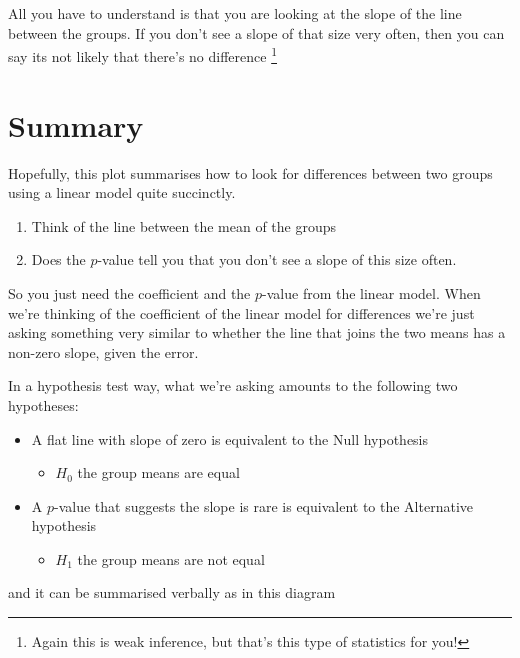 \documentclass[
]{book}
\providecommand{\tightlist}{%
  \setlength{\itemsep}{0pt}\setlength{\parskip}{0pt}}
\begin{document}
All you have to understand is that you are looking at the slope of the line between the groups. If you don't see a slope of that size very often, then you can say its not likely that there's no difference \footnote{Again this is weak inference, but that's this type of statistics for you!}

\hypertarget{summary}{%
\section{Summary}\label{summary}}

Hopefully, this plot summarises how to look for differences between two groups using a linear model quite succinctly.

\begin{enumerate}
\def\labelenumi{\arabic{enumi}.}
\tightlist
\item
  Think of the line between the mean of the groups
\item
  Does the \(p\)-value tell you that you don't see a slope of this size often.
\end{enumerate}

So you just need the coefficient and the \(p\)-value from the linear model.
When we're thinking of the coefficient of the linear model for differences we're just asking something very similar to whether the line that joins the two means has a non-zero slope, given the error.

In a hypothesis test way, what we're asking amounts to the following two hypotheses:

\begin{itemize}
\tightlist
\item
  A flat line with slope of zero is equivalent to the Null hypothesis

  \begin{itemize}
  \tightlist
  \item
    \(H_{0}\) the group means are equal
  \end{itemize}
\item
  A \(p\)-value that suggests the slope is rare is equivalent to the Alternative hypothesis

  \begin{itemize}
  \tightlist
  \item
    \(H_{1}\) the group means are not equal
  \end{itemize}
\end{itemize}

and it can be summarised verbally as in this diagram
\end{document}
